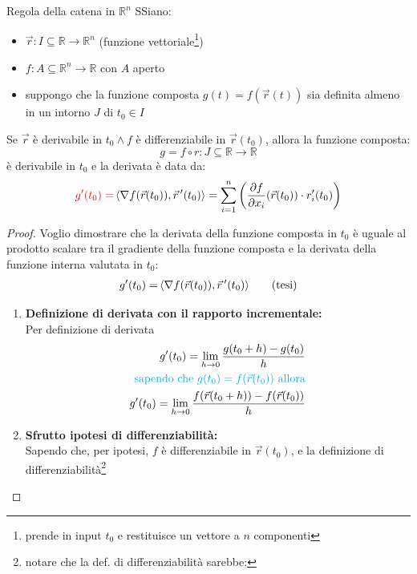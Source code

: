 \documentclass{article}  %
\begin{document}
\begin{theorem}{Regola della catena in $\mathbb{R}^n$}
	SSiano:
	\begin{itemize}
		\item $\vec{r}: I \subseteq \mathbb{R} \to \mathbb{R}^n$ (funzione vettoriale\footnote{prende in input $t_0$ e restituisce un vettore a $n$ componenti})
		\item $f: A \subseteq \mathbb{R}^n \to \mathbb{R}$ con $A$ aperto
		\item suppongo che la funzione composta $g(t)=f(\vec{r}(t))$ sia definita almeno in un intorno $J$ di $t_0 \in I$
	\end{itemize}
	Se $\vec{r}$ è derivabile in $t_0 \land f$ è differenziabile in $\vec{r}(t_0)$, allora la funzione composta:
	\[
		g=f \circ r: J \subseteq \mathbb{R} \to \mathbb{R}
	\]
	è derivabile in $t_0$ e la derivata è data da:
	\[
		\textcolor{red}{g'(t_0) = \,} \langle \nabla f(\vec{r}(t_0)), \vec{r} \, '(t_0) \rangle = \sum_{i=1}^{n}\left(\frac{\partial f}{\partial x_i}(\vec{r}(t_0)) \cdot r_i'(t_0)\right)
	\]
	\begin{proof}
		Voglio dimostrare che la derivata della funzione composta in $t_0$ è uguale al prodotto scalare tra il gradiente della funzione composta e la derivata della funzione interna valutata in $t_0$:
		\begin{align*}
			{g'(t_0) = \,} \langle \nabla f(\vec{r}(t_0)), \vec{r} \, '(t_0) \rangle \tag*{(\text{tesi})}
		\end{align*}
		\begin{enumerate}
			\item \textbf{Definizione di derivata con il rapporto incrementale:} \\
			      Per definizione di derivata
			      \begin{align*}
				      g'(t_0) = \lim_{h \to 0} \frac{g(t_0+h)-g(t_0)}{h}                          \\
				      \textcolor{cyan}{\text{sapendo che } g(t_0)=f(\vec{r}(t_0)) \text{ allora}} \\
				      g'(t_0) = \lim_{h \to 0} \frac{f(\vec{r}(t_0+h))-f(\vec{r}(t_0))}{h}        \\
			      \end{align*}
			\item \textbf{Sfrutto ipotesi di differenziabilità:} \\
			      Sapendo che, per ipotesi, $f$ è differenziabile in $\vec{r}(t_0)$, e la definizione di differenziabilità\footnote{
				      notare che la def. di differenziabilità sarebbe:
}
\end{enumerate}
\end{proof}
\end{theorem}
\end{document}
